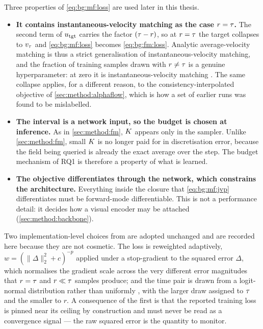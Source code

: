 Three properties of \eqref{eq:bg:mf:loss} are used later in this thesis.

\begin{itemize}
  \item \textbf{It contains instantaneous-velocity matching as the case $r = \tau$.} The second term of
    $u_{\textrm{tgt}}$ carries the factor $(\tau-r)$, so at $r=\tau$ the target collapses to
    $v_{\tau}$ and \eqref{eq:bg:mf:loss} becomes \eqref{eq:bg:fm:loss}. Analytic
    average-velocity matching is thus a strict generalisation of instantaneous-velocity matching, and the fraction of training
    samples drawn with $r \neq \tau$ is a genuine hyperparameter: at zero it is instantaneous-velocity matching
    \parencite[Tab.~1a]{geng2025meanflow}. The same collapse applies, for a different reason, to the
    consistency-interpolated objective of \autoref{sec:method:alphaflow}, which is how a set of earlier runs
    was found to be mislabelled.
  \item \textbf{The interval is a network input, so the budget is chosen at inference.} As in
    \autoref{sec:method:fm}, $K$ appears only in the sampler. Unlike \autoref{sec:method:fm}, small $K$ is
    no longer paid for in discretisation error, because the field being queried is already the
    exact average over the step. The budget mechanism of RQ1 is therefore a property of what is
    learned.
  \item \textbf{The objective differentiates through the network, which constrains the
    architecture.} Everything inside the closure that \eqref{eq:bg:mf:jvp} differentiates must
    be forward-mode differentiable. This is not a performance detail: it decides how a visual
    encoder may be attached (\autoref{sec:method:backbone}).
\end{itemize}

Two implementation-level choices from \parencite[Sec.~4.3]{geng2025meanflow} are adopted unchanged and are
recorded here because they are not cosmetic. The loss is reweighted adaptively,
$w = (\|\Delta\|_{2}^{2}+c)^{-p}$ applied under a stop-gradient to the squared error $\Delta$,
which normalises the gradient scale across the very different error magnitudes that $r=\tau$
and $r\ll\tau$ samples produce; and the time pair is drawn from a logit-normal distribution
rather than uniformly \parencite{esser2024scaling}, with the larger draw assigned to $\tau$ and the
smaller to $r$. A
consequence of the first is that the reported training loss is pinned near its ceiling by
construction and must never be read as a convergence signal --- the raw squared error is the
quantity to monitor. 


